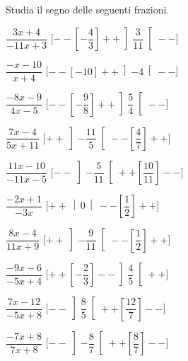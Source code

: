 \begin{esercizio}\label{ese:dis_7}
 Studia il segno delle seguenti frazioni.
\begin{multicols}{2}
 \begin{enumeratea}
  \item  $\dfrac{3 x +4}{-11 x +3}$ \hfill 
  [$--\left [-\dfrac{4}{3} \right ]++\left ]\dfrac{3}{11} \right [--$]
  \item  $\dfrac{- x -10}{x +4}$ \hfill 
  [$--\left [-10 \right ]++\left ]-4 \right [--$]
  \item  $\dfrac{-8 x -9}{4 x -5}$ \hfill 
  [$--\left [-\dfrac{9}{8} \right ]++\left ]\dfrac{5}{4} \right [--$]
  \item  $\dfrac{7 x -4}{5 x +11}$ \hfill 
  [$++\left ]-\dfrac{11}{5} \right [--\left [\dfrac{4}{7} \right ]++$]
  \item  $\dfrac{11 x -10}{-11 x -5}$ \hfill 
  [$--\left ]-\dfrac{5}{11} \right [++\left [\dfrac{10}{11} \right ]--$]
  \item  $\dfrac{-2 x +1}{-3 x }$ \hfill 
  [$++\left ]0 \right [--\left [\dfrac{1}{2} \right ]++$]
  \item  $\dfrac{8 x -4}{11 x +9}$ \hfill 
  [$++\left ]-\dfrac{9}{11} \right [--\left [\dfrac{1}{2} \right ]++$]
  \item  $\dfrac{-9 x -6}{-5 x +4}$ \hfill 
  [$++\left [-\dfrac{2}{3} \right ]--\left ]\dfrac{4}{5} \right [++$]
  \item  $\dfrac{7 x -12}{-5 x +8}$ \hfill 
  [$--\left ]\dfrac{8}{5} \right [++\left [\dfrac{12}{7} \right ]--$]
  \item  $\dfrac{-7 x +8}{7 x +8}$ \hfill 
  [$--\left ]-\dfrac{8}{7} \right [++\left [\dfrac{8}{7} \right ]--$]
 \end{enumeratea}
\end{multicols}
\end{esercizio}

